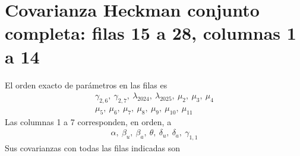 \documentclass[11pt,a4paper]{article}
\begin{document}
\section{Covarianza Heckman conjunto completa: filas 15 a 28, columnas 1 a 14}
El orden exacto de parámetros en las filas es
\[
\begin{gathered}\gamma_{2,6},\ \gamma_{2,7},\ \lambda_{2024},\ \lambda_{2025},\ \mu_2,\ \mu_3,\ \mu_4\\\mu_5,\ \mu_6,\ \mu_7,\ \mu_8,\ \mu_9,\ \mu_10,\ \mu_11\end{gathered}
\]
Las columnas 1 a 7 corresponden, en orden, a
\[
\begin{gathered}\alpha,\ \beta_u,\ \beta_a,\ \theta,\ \delta_u,\ \delta_a,\ \gamma_{1,1}\end{gathered}
\]
Sus covarianzas con todas las filas indicadas son
\end{document}

